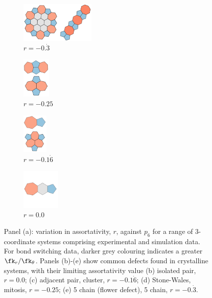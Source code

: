 \begin{figure}[bt]
	\vspace{0.2cm}     
     \begin{subfigure}[b]{0.2\textwidth}
         \centering
         \includegraphics[height=2cm]{./figures/general_networks/defect_-33.pdf}
         \caption{$r=-0.\dot{3}$}
         \label{fig:defect33}
     \end{subfigure}
     \hfill
   \begin{subfigure}[b]{0.2\textwidth}
         \centering
         \includegraphics[height=2cm]{./figures/general_networks/defect_-25.pdf}
         \caption{$r=-0.25$}
         \label{fig:defect25}
     \end{subfigure}
     \hfill
     \begin{subfigure}[b]{0.2\textwidth}
      \centering
     \includegraphics[height=2cm]{./figures/general_networks/defect_-17.pdf}
         \caption{$r=-0.1\dot{6}$}
         \label{fig:defect17}
     \end{subfigure}
     \hfill
     \begin{subfigure}[b]{0.2\textwidth}
      \centering
     \includegraphics[height=2cm]{./figures/general_networks/defect_0.pdf}
         \caption{$r=0.0$}
         \label{fig:defect0}
     \end{subfigure}
     \hfill
   
     \caption{Panel (a): variation in assortativity, $r$, against $p_6$ for a range of 3\--coordinate systems comprising experimental and simulation data. For bond switching data, darker grey colouring indicates a greater $\fk_r/\fk_\theta$.
Panels (b)\--(e) show common defects found in crystalline systems, with their limiting assortativity value (b) isolated pair, $r=0.0$; (c) adjacent pair, cluster, $r=-0.1\dot{6}$;  (d) Stone\--Wales, mitosis, $r=-0.25$;  (e) 5 chain (flower defect), 5 chain, $r=-0.\dot{3}$.}
     \label{fig:assortgen}
\end{figure}

